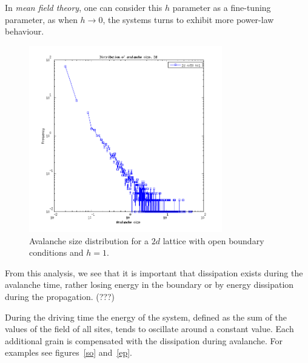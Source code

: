 In \emph{mean field theory}, one can consider this $h$ parameter as a fine-tuning parameter, as when $h\longrightarrow0$, the systems turns to exhibit more power-law behaviour.

\begin{figure}
\begin{center}
\includegraphics[width=0.75\textwidth]{results/2soh.png}
\caption{Avalanche size distribution for a $2d$ lattice with open boundary conditions and $h=1$. }
\label{soh}
\end{center}
\end{figure} 

From this analysis, we see that it is important that dissipation exists during the avalanche time, rather losing energy in the boundary or by energy dissipation during the propagation. (???)

During the driving time the energy of the system, defined as the sum of the values of the field of all sites, tends to oscillate around a constant value. Each additional grain is compensated with the dissipation during avalanche. For examples see figures~\ref{so} and~\ref{ep}.



